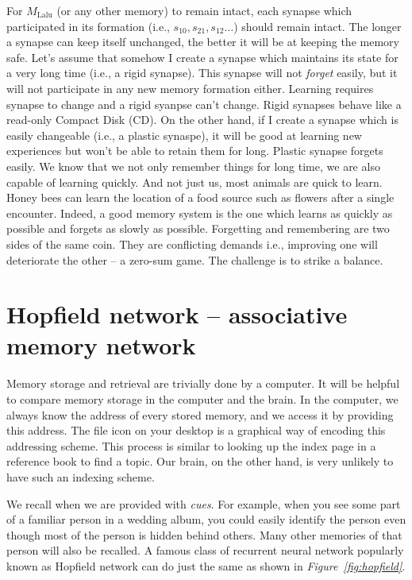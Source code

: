\documentclass[]{resonance}
\newcommand\Fig[1]{\textit{Figure~\ref{#1}}}
\begin{document}
For $M_\text{Lalu}$ (or any other memory) to remain intact, each synapse which
participated in its formation (i.e., $s_{10}, s_{21}, s_{12} \ldots$) should
remain intact. The longer a synapse can keep itself unchanged, the better it
will be at keeping the memory safe. Let's assume that somehow I create a synapse
which maintains its state for a very long time (i.e., a rigid synapse). This
synapse will not \emph{forget} easily, but it will not participate in any new
memory formation either. Learning requires synapse to change and a rigid syanpse
can't change.  Rigid synapses behave like a read-only Compact Disk (CD). On the
other hand, if I create a synapse which is easily changeable (i.e., a plastic
synaspe), it will be good at learning new experiences but won't be able to
retain them for long. Plastic synapse forgets easily.  We know that we not only
remember things for long time, we are also capable of learning quickly. And not
just us, most animals are quick to learn. Honey bees can learn the location of a
food source such as flowers after a single encounter. Indeed, a good memory
system is the one which learns as quickly as possible and forgets as slowly as
possible. Forgetting and remembering are two sides of the same coin. They are
conflicting demands i.e., improving one will deteriorate the other -- a zero-sum
game. The challenge is to strike a balance. 

\section{Hopfield network -- associative memory network}\label{sec:hopfield}

Memory storage and retrieval are trivially done by a computer. It will be helpful
to compare memory storage in the computer and the brain. In the computer, we
always know the address of every stored memory, and we access it by providing
this address. The file icon on your desktop is a graphical way of encoding this
addressing scheme. This process is similar to looking up the index page in a
reference book to find a topic. Our brain, on the other hand, is very unlikely
to have such an indexing scheme. 

We recall when we are provided with \textit{cues}. For example, when you see
some part of a familiar person in a wedding album, you could easily identify the
person even though most of the person is hidden behind others.  Many other
memories of that person will also be recalled. A famous class of recurrent
neural network popularly known as Hopfield network can do just the same as shown
in \Fig{fig:hopfield}.
\end{document}
